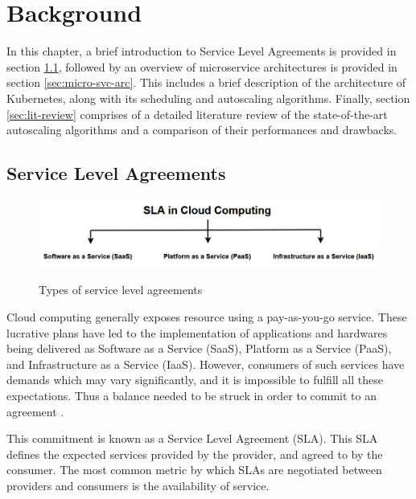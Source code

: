 \clearpage

\def\chaptertitle{Background}

\lhead{\emph{\chaptertitle}}

\chapter{\chaptertitle}
\label{ch:background}

In this chapter, a brief introduction to Service Level Agreements is provided in section \ref{sec:sla}, followed by an overview of microservice architectures is provided in section \ref{sec:micro-svc-arc}. This includes a brief description of the architecture of Kubernetes, along with its scheduling and autoscaling algorithms. Finally, section \ref{sec:lit-review} comprises of a detailed literature review of the state-of-the-art autoscaling algorithms and a comparison of their performances and drawbacks.

\section{Service Level Agreements}
\label{sec:sla}

\begin{figure}[htb]
    \centering
    \caption{Types of service level agreements}
    \includegraphics[width=0.9\linewidth]{Figures/SLA-Cloud-Computing.png}
    \label{fig:sla-types}
\end{figure}

Cloud computing generally exposes resource using a pay-as-you-go service. These lucrative plans have led to the implementation of applications and hardwares being delivered as Software as a Service (SaaS), Platform as a Service (PaaS), and Infrastructure as a Service (IaaS). However, consumers of such services have demands which may vary significantly, and it is impossible to fulfill all these expectations. Thus a balance needed to be struck in order to commit to an agreement \cite{patel2009service}. \par
This commitment is known as a Service Level Agreement (SLA). This SLA defines the expected services provided by the provider, and agreed to by the consumer. The most common metric by which SLAs are negotiated between providers and consumers is the availability of service.

